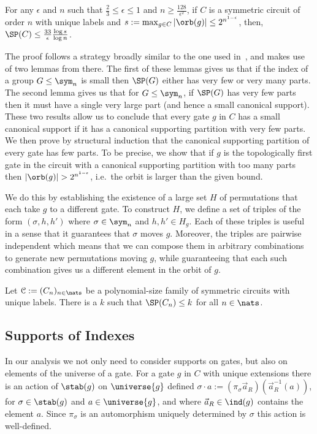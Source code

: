 \documentclass[a4paper,UKenglish]{lipics-v2018}
\begin{document}
\begin{theorem}
  \label{thm:support-thm}
  For any $\epsilon$ and $n$ such that $\frac{2}{3} \leq \epsilon \leq 1$ and $n
  \geq \frac{128}{\epsilon^2}$, if $C$ is a symmetric circuit of order $n$ with
  unique labels and $s := \max_{g \in C} \vert \orb (g)\vert \leq
  2^{n^{1-\epsilon}}$, then, $\SP(C) \leq \frac{33}{\epsilon}\frac{\log s}{\log
    n}$.
\end{theorem}

The proof follows a strategy broadly similar to the one used
in~\cite{AndersonD17}, and makes use of two lemmas from there. The first of
these lemmas gives us that if the index of a group $G \leq \sym_n$ is small then
$\SP(G)$ either has very few or very many parts. The second lemma gives us that
for $G \leq \sym_n$, if $\SP(G)$ has very few parts then it must have a single
very large part (and hence a small canonical support). These two results allow
us to conclude that every gate $g$ in $C$ has a small canonical support if it
has a canonical supporting partition with very few parts. We then prove by
structural induction that the canonical supporting partition of every gate has
few parts. To be precise, we show that if $g$ is the topologically first gate in
the circuit with a canonical supporting partition with too many parts then
$\vert \orb(g) \vert > 2^{n^{1 - \epsilon}}$, i.e.\ the orbit is larger than the
given bound.

We do this by establishing the existence of a large set $H$ of permutations that
each take $g$ to a different gate. To construct $H$, we define a set of triples
of the form $(\sigma, h, h')$ where $\sigma \in \sym_n$ and $h,h' \in H_g$. Each
of these triples is useful in a sense that it guarantees that $\sigma$ moves
$g$. Moreover, the triples are pairwise independent which means that we can
compose them in arbitrary combinations to generate new permutations moving $g$,
while guaranteeing that each such combination gives us a different element in
the orbit of $g$.

\begin{lemma}
  Let $\mathcal{C} := (C_n)_{n \in \nats}$ be a polynomial-size family of
  symmetric circuits with unique labels. There is a $k$ such that $\SP(C_n) \leq
  k$ for all $n \in \nats$.
  \label{lem:constant-size-support}
\end{lemma}

\subsection{Supports of Indexes}
In our analysis we not only need to consider supports on gates, but also on
elements of the universe of a gate. For a gate $g$ in $C$ with unique extensions
there is an action of $\stab(g)$ on $\universe{g}$ defined $\sigma \cdot a :=
(\pi_{\sigma}\vec{a}_R) (\vec{a}^{-1}_R(a))$, for $\sigma \in \stab(g)$ and $a
\in \universe{g}$, and where $\vec{a}_R \in \ind(g)$ contains the element $a$.
Since $\pi_{\sigma}$ is an automorphism uniquely determined by $\sigma$ this
action is well-defined.
\end{document}
